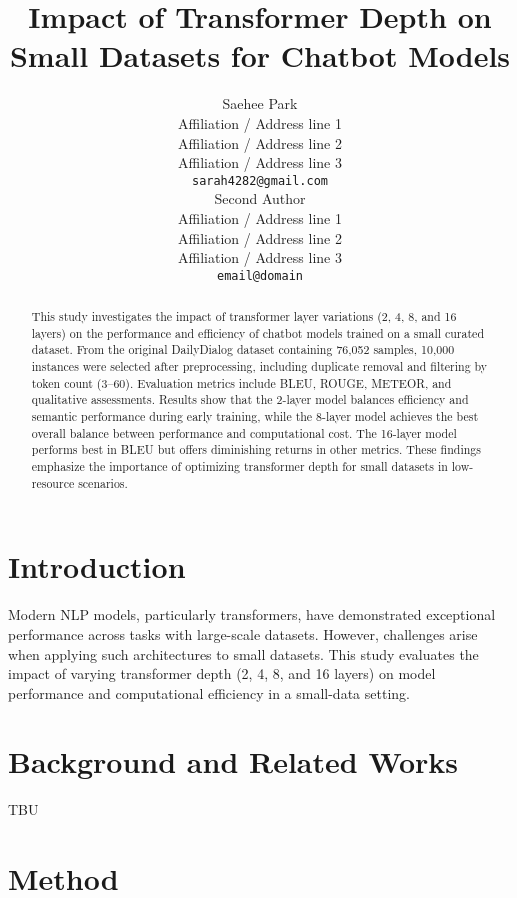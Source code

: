 \documentclass[11pt]{article}
\title{Impact of Transformer Depth on Small Datasets for Chatbot Models}
\author{Saehee Park\\
  Affiliation / Address line 1 \\
  Affiliation / Address line 2 \\
  Affiliation / Address line 3 \\
  \texttt{sarah4282@gmail.com} \\\And
  Second Author \\
  Affiliation / Address line 1 \\
  Affiliation / Address line 2 \\
  Affiliation / Address line 3 \\
  \texttt{email@domain} \\}
\begin{document}
\maketitle
\begin{abstract}
This study investigates the impact of transformer layer variations (2, 4, 8, and 16 layers) on the performance and efficiency of chatbot models trained on a small curated dataset. From the original DailyDialog dataset containing 76,052 samples, 10,000 instances were selected after preprocessing, including duplicate removal and filtering by token count (3–60). Evaluation metrics include BLEU, ROUGE, METEOR, and qualitative assessments. Results show that the 2-layer model balances efficiency and semantic performance during early training, while the 8-layer model achieves the best overall balance between performance and computational cost. The 16-layer model performs best in BLEU but offers diminishing returns in other metrics. These findings emphasize the importance of optimizing transformer depth for small datasets in low-resource scenarios.
\end{abstract}

\section{Introduction}

Modern NLP models, particularly transformers, have demonstrated exceptional performance across tasks with large-scale datasets. However, challenges arise when applying such architectures to small datasets. This study evaluates the impact of varying transformer depth (2, 4, 8, and 16 layers) on model performance and computational efficiency in a small-data setting.


\section{Background and Related Works}
TBU

\section{Method}
\end{document}
